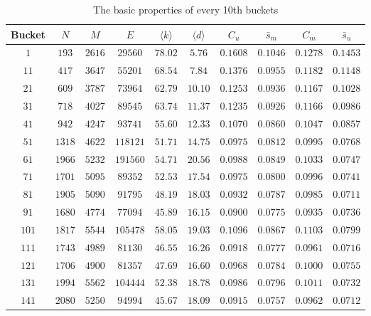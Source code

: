       \begin{table}[H]
        \begin{tabularx}{\textwidth}{|C{1.1}|C{0.95}|C{0.95}|C{1}|C{1}|C{1}|C{1}|C{1}|C{1}|C{1}|} \hline
           \textbf{Bucket} & $N$ & $M$ & $E$ & $\langle k \rangle$ & $\langle d \rangle$ & $C_u$ & $\bar s_m$ & $C_m$ & $\bar s_u$ \\\hline
$1$ & $193$ & $2616$ & $29560$ & $78.02$ & $5.76$ & $0.1608$ & $0.1046$ & $0.1278$ & $0.1453$ \\\hline
$11$ & $417$ & $3647$ & $55201$ & $68.54$ & $7.84$ & $0.1376$ & $0.0955$ & $0.1182$ & $0.1148$ \\\hline
$21$ & $609$ & $3787$ & $73964$ & $62.79$ & $10.10$ & $0.1253$ & $0.0936$ & $0.1167$ & $0.1028$ \\\hline
$31$ & $718$ & $4027$ & $89545$ & $63.74$ & $11.37$ & $0.1235$ & $0.0926$ & $0.1166$ & $0.0986$ \\\hline
$41$ & $942$ & $4247$ & $93741$ & $55.60$ & $12.33$ & $0.1070$ & $0.0860$ & $0.1047$ & $0.0857$ \\\hline
$51$ & $1318$ & $4622$ & $118121$ & $51.71$ & $14.75$ & $0.0975$ & $0.0812$ & $0.0995$ & $0.0768$ \\\hline
$61$ & $1966$ & $5232$ & $191560$ & $54.71$ & $20.56$ & $0.0988$ & $0.0849$ & $0.1033$ & $0.0747$ \\\hline
$71$ & $1701$ & $5095$ & $89352$ & $52.53$ & $17.54$ & $0.0975$ & $0.0800$ & $0.0996$ & $0.0741$ \\\hline
$81$ & $1905$ & $5090$ & $91795$ & $48.19$ & $18.03$ & $0.0932$ & $0.0787$ & $0.0985$ & $0.0711$ \\\hline
$91$ & $1680$ & $4774$ & $77094$ & $45.89$ & $16.15$ & $0.0900$ & $0.0775$ & $0.0935$ & $0.0736$ \\\hline
$101$ & $1817$ & $5544$ & $105478$ & $58.05$ & $19.03$ & $0.1096$ & $0.0867$ & $0.1103$ & $0.0799$ \\\hline
$111$ & $1743$ & $4989$ & $81130$ & $46.55$ & $16.26$ & $0.0918$ & $0.0777$ & $0.0961$ & $0.0716$ \\\hline
$121$ & $1706$ & $4900$ & $81357$ & $47.69$ & $16.60$ & $0.0968$ & $0.0784$ & $0.1000$ & $0.0755$ \\\hline
$131$ & $1994$ & $5562$ & $104444$ & $52.38$ & $18.78$ & $0.0986$ & $0.0796$ & $0.1011$ & $0.0732$ \\\hline
$141$ & $2080$ & $5250$ & $94994$ & $45.67$ & $18.09$ & $0.0915$ & $0.0757$ & $0.0962$ & $0.0712$ \\\hline        \end{tabularx}
        \caption{The basic properties of every 10th buckets}
        \label{tab:cs_properties}
      \end{table}

